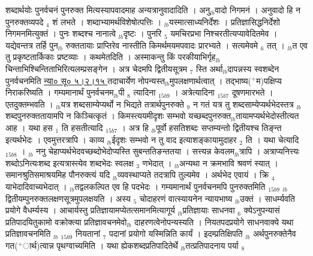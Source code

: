 \documentclass[article,12pt,a4paper]{memoir}%
\newcommand{\add}[1]{($^{+}$#1)}
\begin{document}
	  
	  \pstart \leavevmode%
	\hphantom{.}{\color{DodgerBlue3}शब्दार्थयोः पुनर्वचनं पुनरुक्त} मित्यस्यापवादमाह {\color{DodgerBlue3}अन्यत्रानुवादादिति} । अनु{\tiny $_{lb}$}वादो निगमनं । अनुवादो हि न पुनरुक्तव्यपदे {\tiny $_{4}$} शं लभते । शब्दाभ्यामर्थविशेषोत्पत्तिः । {\tiny $_{lb}$}यस्मात्साध्यनिर्देशः । प्रतिज्ञासिद्धनिर्देशो निगमनमित्युक्तं । पुनः शब्दश्च नानात्वे {\tiny $_{lb}$}दृष्टः । पुनरि {\tiny $_{5}$} यमचिरप्रभा निश्चरतीत्यप्यावेदितमेव । यद्येवन्तत्र तर्हि पुन{\tiny $_{lb}$}\leavevmode{} रुक्ततायाः प्राप्तिरेव नास्तीति किमर्थमयमपवादः प्रारभ्यते । सत्यमेवमे {\tiny $_{6}$} तत् । {\tiny $_{lb}$}त एव तु प्रकृष्टतार्किकाः प्रष्टव्याः । कथमेतदिति । अस्माकन्तु किं परकीयाभिर्गृह{\tiny $_{lb}$}चिन्ताभिश्चिन्तिताभिरित्यलम्प्रसङ्गेन । अत्र चेदमपि द्वितीयसूत्रम {\tiny $_{7}$} स्ति अर्था{\tiny $_{lb}$}दापन्नस्य स्वशब्देन पुनर्वचनमिति \href{http://sarit.indology.info/?cref=ns\%C5\%AB.5.2.15}{न्या० सू० ५।२।१५ } तदाचार्येण नोपन्यस्त{\tiny $_{lb}$}मुपलक्षणार्थत्वात् । तद्भाष्य\add{म}पक्षिप्य निराकरिष्यति । {\color{DodgerBlue3}गम्यमानार्थं} पुनर्वचनम{\tiny $_{lb}$}पी {\tiny $_{8}$} त्यादिना {\tiny $_{15b9}$} । {\color{DodgerBlue3}अत्रेत्यादिना} {\tiny $_{15b7}$} दूषणमारभते । एतदुक्तम्भवति । {\tiny $_{lb}$}यत्र शब्दसाम्येप्यर्थो न भिद्यते तत्रार्थपुनरुक्ते {\tiny $_{9}$} \leavevmode{} न गतं यत्र तु शब्दसाम्येप्यर्थभेदस्तत्र {\tiny $_{lb}$}शब्दपुनरुक्ततायामपि न किञ्चित्कृतं । किमस्त्ययमीदृशः सम्भवो यच्छब्दपुनरुक्त{\tiny $_{lb}$}तायामप्यर्थभेदोस्तीत्यत आह । {\color{DodgerBlue3}यथा हस {\tiny $_{1}$} ति हसतीत्यादि} {\tiny $_{15b7}$} । अत्र हि {\tiny $_{lb}$}पूर्वो हसतिशब्दः सप्तम्यन्तो द्वितीयश्च तिङ्न्त इत्यर्थभेदः । एवमुत्तरत्रापि । काव्य {\tiny $_{lb}$}ईदृशः सम्भवो न तु वाद इत्याशङ्कायामुदाहर {\tiny $_{2}$} ति । यथा चेत्यादि {\tiny $_{15b8}$} । {\tiny $_{lb}$} {\color{DodgerBlue3}ननु} चेहाप्यर्थभेदवच्छब्दोभेदोप्यस्ति सुबन्ततिङन्ततया । सत्त्यन्न केवलम{\tiny $_{lb}$}त्रापि । अत्राप्यनित्त्यः शब्दोऽनित्यःशब्द इत्यत्रास्त्येव शब्दभेदः स्वलक्ष {\tiny $_{3}$} णभेदात् । {\tiny $_{lb}$}अन्यथा न क्रमभावि श्रवणं स्यात् । समानश्रुतिसमाश्रयमिह पौनरुक्त्यं यदि {\tiny $_{lb}$}व्यवस्थाप्यते तदत्रापि तुल्यमेव । अर्थभेद एवायं । क्रि {\tiny $_{4}$} याभेदादिवाच्यभेदात् । {\tiny $_{lb}$}तद्वलकल्पित एव हि पदभेदः । {\color{DodgerBlue3}गम्यमानार्थं पुनर्वचनमपि पुनरुक्तमिति} {\tiny $_{15b9}$} {\tiny $_{lb}$} द्वितीयम्पुनरुक्तलक्षणसूत्रमुपलक्षयति । अस्य {\tiny $_{5}$} चोदाहरणं {\color{DodgerBlue3}वात्स्यायनेन} न्यायभाष्य {\tiny $_{lb}$}उक्तं । साधर्म्यवति प्रयोगे वैधर्म्यस्य । आचार्यस्तु प्रतिज्ञायामप्येतत्समानमित्यागूर्य {\tiny $_{lb}$}प्रतिज्ञायाः साधनवा {\tiny $_{6}$} क्येऽनुपन्यासं प्रतिपादयितुकामो वक्रोक्त्या प्रतिज्ञावचनमेवो{\tiny $_{lb}$}\leavevmode{} दाहरणत्वेनोपन्यस्यति । {\color{DodgerBlue3}नियतपदप्रयोगे साधनवाक्ये यथा प्रतिज्ञावचनमिति} {\tiny $_{lb}$} {\tiny $_{15b9}$} नियतानां {\tiny $_{7}$} पदानां प्रयोगो यस्मिन्निति कार्यं । इदम्प्रतिक्षिपति {\tiny $_{lb}$} {\color{DodgerBlue3}अर्थपुनरुक्तेनैव गत\add{ार्थ}त्वान्न पृथग्वाच्यमिति} । यथा ह्येकशब्दप्रतिपादितेर्थे {\tiny $_{lb}$}तत्प्रतिपादनाय पर्या {\tiny $_{8}$} 
\end{document}
